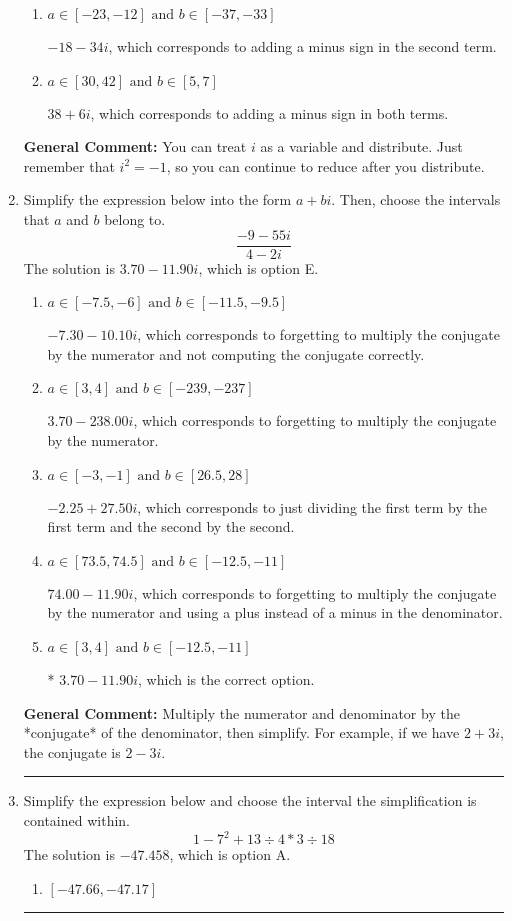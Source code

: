 \documentclass{extbook}[14pt]
\newcommand{\litem}[1]{\item #1

\rule{\textwidth}{0.4pt}}
\begin{document}
\begin{enumerate}
{\begin{enumerate}[label=\Alph*.]
* $38 - 6 i$, which is the correct option.
\item \( a \in [-23, -12] \text{ and } b \in [-37, -33] \)

 $-18 - 34 i$, which corresponds to adding a minus sign in the second term.
\item \( a \in [30, 42] \text{ and } b \in [5, 7] \)

 $38 + 6 i$, which corresponds to adding a minus sign in both terms.
\end{enumerate}

\textbf{General Comment:} You can treat $i$ as a variable and distribute. Just remember that $i^2=-1$, so you can continue to reduce after you distribute.
}
\litem{
Simplify the expression below into the form $a+bi$. Then, choose the intervals that $a$ and $b$ belong to.
\[ \frac{-9 - 55 i}{4 - 2 i} \]The solution is \( 3.70  - 11.90 i \), which is option E.\begin{enumerate}[label=\Alph*.]
\item \( a \in [-7.5, -6] \text{ and } b \in [-11.5, -9.5] \)

 $-7.30  - 10.10 i$, which corresponds to forgetting to multiply the conjugate by the numerator and not computing the conjugate correctly.
\item \( a \in [3, 4] \text{ and } b \in [-239, -237] \)

 $3.70  - 238.00 i$, which corresponds to forgetting to multiply the conjugate by the numerator.
\item \( a \in [-3, -1] \text{ and } b \in [26.5, 28] \)

 $-2.25  + 27.50 i$, which corresponds to just dividing the first term by the first term and the second by the second.
\item \( a \in [73.5, 74.5] \text{ and } b \in [-12.5, -11] \)

 $74.00  - 11.90 i$, which corresponds to forgetting to multiply the conjugate by the numerator and using a plus instead of a minus in the denominator.
\item \( a \in [3, 4] \text{ and } b \in [-12.5, -11] \)

* $3.70  - 11.90 i$, which is the correct option.
\end{enumerate}

\textbf{General Comment:} Multiply the numerator and denominator by the *conjugate* of the denominator, then simplify. For example, if we have $2+3i$, the conjugate is $2-3i$.
}
\litem{
Simplify the expression below and choose the interval the simplification is contained within.
\[ 1 - 7^2 + 13 \div 4 * 3 \div 18 \]The solution is \( -47.458 \), which is option A.\begin{enumerate}[label=\Alph*.]
\item \( [-47.66, -47.17] \)


\end{enumerate}}
\end{enumerate}
\end{document}
